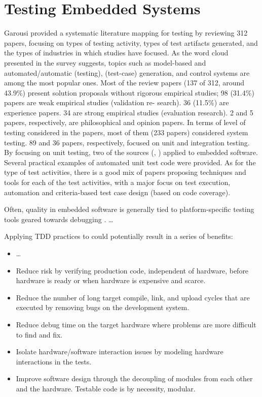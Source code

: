 \section{Testing Embedded Systems}
Garousi \etal \cite{DBLP:journals/infsof/GarousiFKY18} provided a systematic literature mapping for \es testing by reviewing 312 papers, focusing on types of testing activity, types of test artifacts generated, and the types of industries in which studies have focused. As the word cloud presented in the survey suggests, topics such as model-based and automated/automatic (testing), (test-case) generation, and control systems are among the most popular ones. Most of the review papers (137 of 312, around 43.9\%) present solution proposals without rigorous empirical studies; 98 (31.4\%) papers are weak empirical studies (validation re-
search). 36 (11.5\%) are experience papers. 34 are strong empirical studies (evaluation research). 2 and 5 papers, respectively, are philosophical and opinion papers.
In terms of level of testing considered in the papers, most of them (233 papers) considered system testing. 89 and 36 papers, respectively, focused on unit and integration testing. By focusing on unit testing, two of the sources (\cite{4428578}, \cite{DBLP:conf/isese/GuanOA06}) applied \tdd to embedded software. Several practical examples of automated unit test code were provided.
As for the type of test activities, there is a good mix of papers proposing techniques and tools for each of the test activities, with a major focus on test execution, automation and criteria-based test case design (\eg based on code coverage).


\cite{DBLP:journals/software/GarousiFKY18}


Often, quality in embedded software is generally tied to platform-specific testing tools geared towards debugging \cite{TDDEmbeddedSoftware}.
\dots


Applying TDD practices to \ess could potentially result in a series of benefits:
\begin{itemize}
    \item \dots
\end{itemize}


\begin{itemize}
    \item Reduce risk by verifying production code, independent of hardware, before hardware is ready or when hardware is expensive and scarce.
    \item Reduce the number of long target compile, link, and upload cycles that are executed by removing bugs on the development system.
    \item Reduce debug time on the target hardware where problems are more difficult to find and fix.
    \item Isolate hardware/software interaction issues by modeling hardware interactions in the tests.
    \item Improve software design through the decoupling of modules from each other and the hardware. Testable code is by necessity, modular.
\end{itemize}


